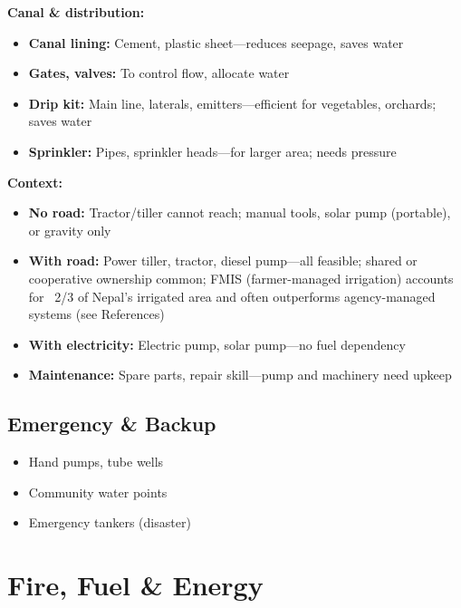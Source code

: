 \documentclass[11pt,a4paper]{article}
\begin{document}
\textbf{Canal \& distribution:}
\begin{itemize}
    \item \textbf{Canal lining:} Cement, plastic sheet---reduces seepage, saves water
    \item \textbf{Gates, valves:} To control flow, allocate water
    \item \textbf{Drip kit:} Main line, laterals, emitters---efficient for vegetables, orchards; saves water
    \item \textbf{Sprinkler:} Pipes, sprinkler heads---for larger area; needs pressure
\end{itemize}

\textbf{Context:}
\begin{itemize}
    \item \textbf{No road:} Tractor/tiller cannot reach; manual tools, solar pump (portable), or gravity only
    \item \textbf{With road:} Power tiller, tractor, diesel pump---all feasible; shared or cooperative ownership common; FMIS (farmer-managed irrigation) accounts for ~2/3 of Nepal's irrigated area and often outperforms agency-managed systems (see References)
    \item \textbf{With electricity:} Electric pump, solar pump---no fuel dependency
    \item \textbf{Maintenance:} Spare parts, repair skill---pump and machinery need upkeep
\end{itemize}

\subsection{Emergency \& Backup}
\begin{itemize}
    \item Hand pumps, tube wells
    \item Community water points
    \item Emergency tankers (disaster)
\end{itemize}

\section{Fire, Fuel \& Energy}
\end{document}
